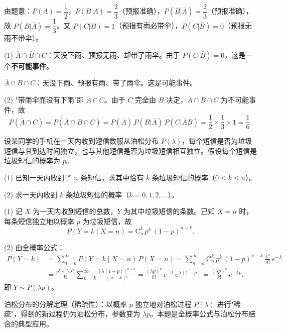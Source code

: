 \documentclass[lang=cn,11pt]{elegantbook}
\begin{document}
\begin{solution}
由题意：\(P(A)=\dfrac{1}{2}\)，\(P(B|A)=\dfrac{2}{3}\)（预报准确），\(P(\overline{B}|\overline{A})=\dfrac{2}{3}\)（预报准确），故 \(P(B|\overline{A})=\dfrac{1}{3}\)。又 \(P(C|B)=1\)（预报有雨必带伞），\(P(C|\overline{B})=0\)（预报无雨不带伞）。

(1) \(\overline{A}\cap\overline{B}\cap C\)：天没下雨、预报无雨、却带了雨伞。由于 \(P(C|\overline{B})=0\)，这是一个\textbf{不可能事件}。\par
\(\overline{A}\cap B\cap C\)：天没下雨、预报有雨、带了雨伞。这是可能事件。

(2) "带雨伞而没有下雨"即 \(\overline{A}\cap C\)。由于 \(C\) 完全由 \(B\) 决定，\(\overline{A}\cap\overline{B}\cap C\) 为不可能事件，故
\[
P(\overline{A}\cap C) = P(\overline{A}\cap B\cap C) = P(\overline{A})\,P(B|\overline{A})\,P(C|\overline{A}B) = \frac{1}{2}\times\frac{1}{3}\times 1 = \frac{1}{6}.
\]
\end{solution}


\begin{exercise}[提高]\label{exer:1-55}
设某同学的手机在一天内收到短信数服从泊松分布 \(P(\lambda)\)，每个短信是否为垃圾短信与其到达时间独立，也与其他短信是否为垃圾短信相互独立。假设每个短信是垃圾短信的概率为 \(p\)。\par
(1) 已知一天内收到了 \(n\) 条短信，求其中恰有 \(k\) 条垃圾短信的概率（\(0\le k\le n\)）。\par
(2) 求一天内收到 \(k\) 条垃圾短信的概率（\(k=0,1,2,\dots\)）。
\end{exercise}

\begin{solution}
(1) 记 \(X\) 为一天内收到短信的总数，\(Y\) 为其中垃圾短信的条数。已知 \(X=n\) 时，每条短信独立地以概率 \(p\) 为垃圾短信，故
\[
P(Y=k\mid X=n) = \mathrm{C}_n^k\,p^k\,(1-p)^{n-k}.
\]

(2) 由全概率公式：
\begin{align*}
P(Y=k) &= \sum_{n=k}^{\infty} P(Y=k\mid X=n)\,P(X=n) = \sum_{n=k}^{\infty} \mathrm{C}_n^k\,p^k\,(1-p)^{n-k}\,\frac{\lambda^n}{n!}\,e^{-\lambda} \\
&= \frac{p^k\,e^{-\lambda}\,\lambda^k}{k!}\sum_{n=k}^{\infty}\frac{[\lambda(1-p)]^{n-k}}{(n-k)!} = \frac{(\lambda p)^k}{k!}\,e^{-\lambda}\,e^{\lambda(1-p)} = \frac{(\lambda p)^k}{k!}\,e^{-\lambda p}.
\end{align*}
即 \(Y\sim P(\lambda p)\)。
\end{solution}

\begin{note}
泊松分布的分解定理（稀疏性）：以概率 \(p\) 独立地对泊松过程 \(P(\lambda)\) 进行"稀疏"，得到的新过程仍为泊松分布，参数变为 \(\lambda p\)。本题是全概率公式与泊松分布结合的典型应用。
\end{note}
\end{document}
